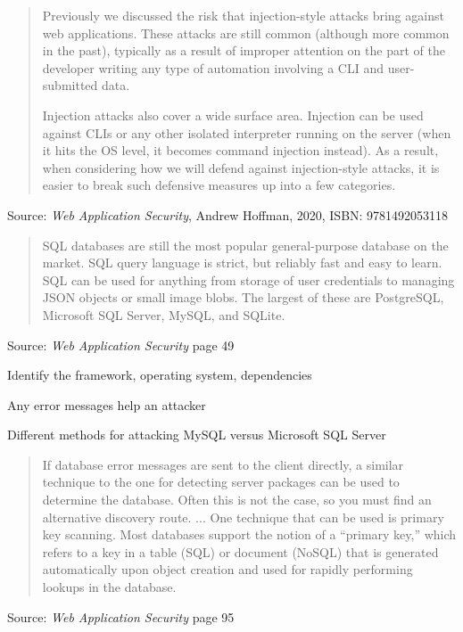 \documentclass[Screen16to9,17pt]{foils}
\begin{document}


\begin{quote}
Previously we discussed the risk that injection-style attacks bring against web applications. These attacks are still common (although more common in the past), typically as a result of improper attention on the part of the developer writing any type of automation involving a CLI and user-submitted data.

Injection attacks also cover a wide surface area. Injection can be used against CLIs or any other isolated interpreter running on the server (when it hits the OS level, it becomes command injection instead). As a result, when considering how we will defend against injection-style attacks, it is easier to break such defensive measures up into a few categories.
\end{quote}

Source: \emph{Web Application Security}, Andrew Hoffman, 2020, ISBN: 9781492053118




\begin{quote}
SQL databases are still the most popular general-purpose database on the market. SQL query language is strict, but reliably fast and easy to learn. SQL can be used for anything from storage of user credentials to managing JSON objects or small image blobs. The largest of these are PostgreSQL, Microsoft SQL Server, MySQL, and SQLite.
\end{quote}
Source: \emph{Web Application Security} page 49

\begin{list2}
\item Identify the framework, operating system, dependencies
\item Any error messages help an attacker
\item Different methods for attacking MySQL versus Microsoft SQL Server
\end{list2}





\begin{quote}
If database error messages are sent to the client directly, a similar technique to the one for detecting server packages can be used to determine the database. Often this is not the case, so you must find an alternative discovery route.
...
One technique that can be used is primary key scanning. Most databases support the notion of a “primary key,” which refers to a key in a table (SQL) or document (NoSQL) that is generated automatically upon object creation and used for rapidly performing lookups in the database.
\end{quote}
Source: \emph{Web Application Security} page 95
\end{document}
